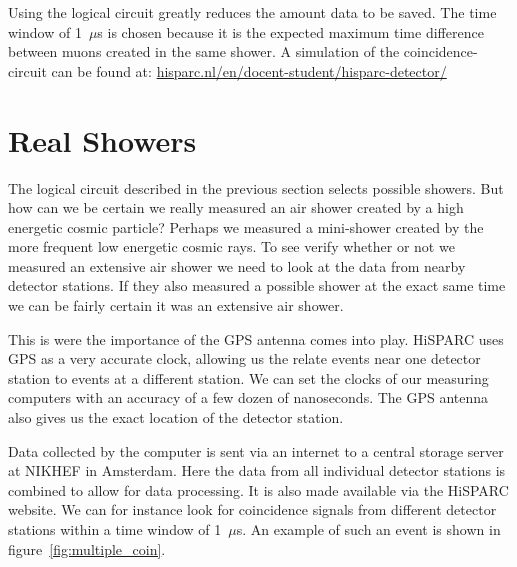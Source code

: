 \documentclass[12pt,a4paper]{article}
\numberwithin{equation}{section}
\numberwithin{figure}{section}
\numberwithin{table}{section}
\begin{document}
Using the logical circuit greatly reduces the amount data to be saved. The time window of 1~$\mu$s is chosen because it is the expected maximum time difference between muons created in the same shower. A simulation of the coincidence-circuit can be found at:
\url{hisparc.nl/en/docent-student/hisparc-detector/}

\section{Real Showers}
The logical circuit described in the previous section selects possible showers. But how can we be certain we really measured an air shower created by a high energetic cosmic particle? Perhaps we measured a mini-shower created by the more frequent low energetic cosmic rays. To see verify whether or not we measured an extensive air shower we need to look at the data from nearby detector stations. If they also measured a possible shower at the exact same time we can be fairly certain it was an extensive air shower.

This is were the importance of the GPS antenna comes into play. HiSPARC uses GPS as a very accurate clock, allowing us the relate events near one detector station to events at a different station. We can set the clocks of our measuring computers with an accuracy of a few dozen of nanoseconds. The GPS antenna also gives us the exact location of the detector station.

Data collected by the computer is sent via an internet to a central storage server at NIKHEF in Amsterdam. Here the data from all individual detector stations is combined to allow for data processing. It is also made available via the HiSPARC website. We can for instance look for coincidence signals from different detector stations within a time window of 1~$\mu$s. An example of such an event is shown in figure~\ref{fig:multiple_coin}.
\end{document}
